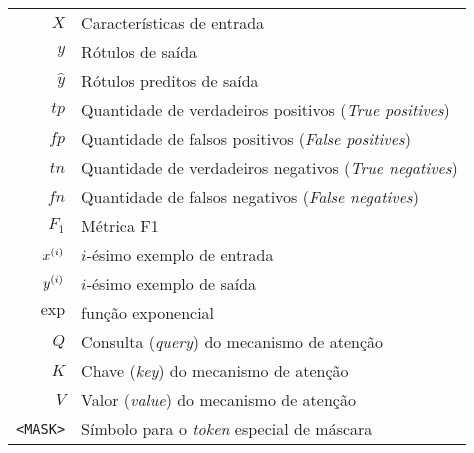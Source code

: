 \clearpage


\begin{tabular}{rl}
$X$ & Características de entrada\\
$y$ & Rótulos de saída\\
$\hat{y}$ & Rótulos preditos de saída\\
$tp$ & Quantidade de verdadeiros positivos (\emph{True positives})\\
$fp$ & Quantidade de falsos positivos (\emph{False positives})\\
$tn$ & Quantidade de verdadeiros negativos (\emph{True negatives})\\
$fn$ & Quantidade de falsos negativos (\emph{False negatives})\\
$F_1$ & Métrica F1\\
$\xii[x]{i}$ & $i$-ésimo exemplo de entrada\\
$\xii[y]{i}$ & $i$-ésimo exemplo de saída\\
$\text{exp}$ & função exponencial\\
$Q$ & Consulta (\emph{query}) do mecanismo de atenção\\
$K$ & Chave (\emph{key}) do mecanismo de atenção\\
$V$ & Valor (\emph{value}) do mecanismo de atenção\\
\texttt{<MASK>} & Símbolo para o \textit{token} especial de máscara\\
\end{tabular}

\clearpage


\disablenewpage{\listoffigures}

\disablenewpage{\listoftables}

\tableofcontents

\egroup %

